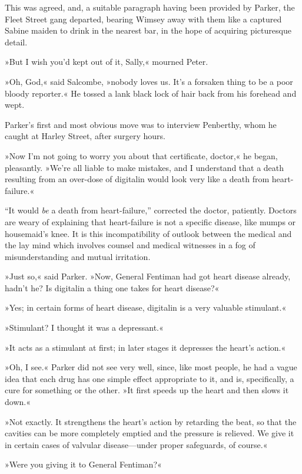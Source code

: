 This was agreed, and, a suitable paragraph having been provided by Parker, the Fleet Street gang departed, bearing Wimsey away with them like a captured Sabine maiden to drink in the nearest bar, in the hope of acquiring picturesque detail.

»But I wish you'd kept out of it, Sally,« mourned Peter.

»Oh, God,« said Salcombe, »nobody loves us. It's a forsaken thing to be a poor bloody reporter.« He tossed a lank black lock of hair back from his forehead and wept.

Parker's first and most obvious move was to interview Penberthy, whom he caught at Harley Street, after surgery hours.

»Now I'm not going to worry you about that certificate, doctor,« he began, pleasantly. »We're all liable to make mistakes, and I understand that a death resulting from an over-dose of digitalin would look very like a death from heart-failure.«

\enquote{It would \textit{be} a death from heart-failure,} corrected the doctor, patiently. Doctors are weary of explaining that heart-failure is not a specific disease, like mumps or housemaid's knee. It is this incompatibility of outlook between the medical and the lay mind which involves counsel and medical witnesses in a fog of misunderstanding and mutual irritation.

»Just so,« said Parker. »Now, General Fentiman had got heart disease already, hadn't he? Is digitalin a thing one takes for heart disease?«

»Yes; in certain forms of heart disease, digitalin is a very valuable stimulant.«

»Stimulant? I thought it was a depressant.«

»It acts as a stimulant at first; in later stages it depresses the heart's action.«

»Oh, I see.« Parker did not see very well, since, like most people, he had a vague idea that each drug has one simple effect appropriate to it, and is, specifically, a cure for something or the other. »It first speeds up the heart and then slows it down.«

»Not exactly. It strengthens the heart's action by retarding the beat, so that the cavities can be more completely emptied and the pressure is relieved. We give it in certain cases of valvular disease\allowbreak---\allowbreak under proper safeguards, of course.«

»Were you giving it to General Fentiman?«

